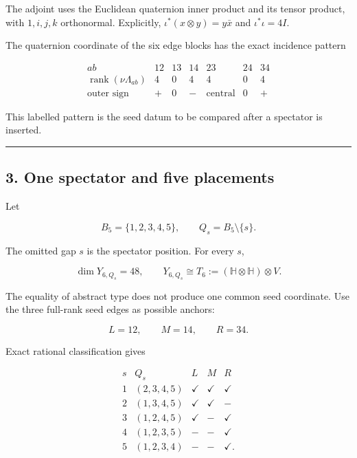 \documentclass[
  11pt,
  a4paper,
]{article}
\begin{document}
The adjoint uses the Euclidean quaternion inner product and its tensor
product, with \(1,i,j,k\) orthonormal. Explicitly,
\(\iota^*(x\otimes y)=y\bar x\) and \(\iota^*\iota=4I\).

The quaternion coordinate of the six edge blocks has the exact incidence
pattern

\[
\begin{array}{c|rrrrrr}
ab&12&13&14&23&24&34\\ \hline
\operatorname{rank}(\nu\Lambda_{ab})&4&0&4&4&0&4\\
\text{outer sign}&+&0&-&\text{central}&0&+
\end{array}
\tag{2.9}
\]

This labelled pattern is the seed datum to be compared after a spectator
is inserted.

\begin{center}\rule{0.5\linewidth}{0.5pt}\end{center}

\hypertarget{one-spectator-and-five-placements}{%
\subsection{3. One spectator and five
placements}\label{one-spectator-and-five-placements}}

Let

\[
B_5=\{1,2,3,4,5\},
\qquad
Q_s=B_5\setminus\{s\}.
\tag{3.1}
\]

The omitted gap \(s\) is the spectator position. For every \(s\),

\[
\dim Y_{6,Q_s}=48,
\qquad
Y_{6,Q_s}\cong T_6
:=(\mathbb H\otimes\mathbb H)\otimes V.
\tag{3.2}
\]

The equality of abstract type does not produce one common seed
coordinate. Use the three full-rank seed edges as possible anchors:

\[
L=12,
\qquad
M=14,
\qquad
R=34.
\tag{3.3}
\]

Exact rational classification gives

\[
\begin{array}{c|c|ccc}
s&Q_s&L&M&R\\ \hline
1&(2,3,4,5)&\checkmark&\checkmark&\checkmark\\
2&(1,3,4,5)&\checkmark&\checkmark&-\\
3&(1,2,4,5)&\checkmark&-&\checkmark\\
4&(1,2,3,5)&-&-&\checkmark\\
5&(1,2,3,4)&-&-&\checkmark.
\end{array}
\tag{3.4}
\]
\end{document}
